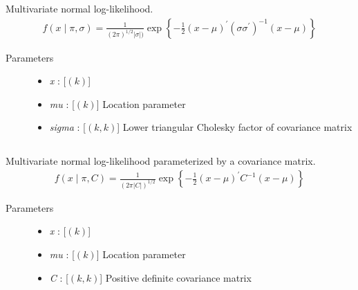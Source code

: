 \documentclass[]{jss}
\begin{document}
Multivariate normal log-likelihood.
\begin{eqnarray*}
f(x \mid \pi, \sigma) = \frac{1}{(2\pi)^{1/2}|\sigma|)} \exp\left\{ -\frac{1}{2} (x-\mu)^{\prime}(\sigma \sigma^{\prime})^{-1}(x-\mu) \right\}    
\end{eqnarray*}

\begin{description}
\item[Parameters] \leavevmode\begin{itemize}
\item {} 
\emph{x} : [$(k)$]

\item {} 
\emph{mu} : [$(k)$] Location parameter

\item {} 
\emph{sigma} : [$(k,k)$] Lower triangular Cholesky factor of covariance matrix

\end{itemize}

\end{description}


\subsection[multivariate normal, covariance parameterization]{ }

Multivariate normal log-likelihood parameterized by a covariance matrix.
\begin{eqnarray*}
f(x \mid \pi, C) = \frac{1}{(2\pi|C|)^{1/2}} \exp\left\{ -\frac{1}{2} (x-\mu)^{\prime}C^{-1}(x-\mu) \right\}    
\end{eqnarray*}
\begin{description}
\item[Parameters] \leavevmode\begin{itemize}
\item {} 
\emph{x} : [$(k)$]

\item {} 
\emph{mu} : [$(k)$] Location parameter

\item {} 
\emph{C} : [$(k,k)$] Positive definite covariance matrix

\end{itemize}

\end{description}


\subsection[Wishart]{ }
\end{document}
